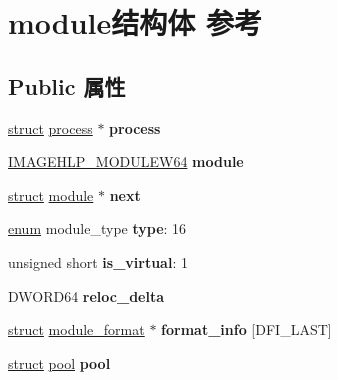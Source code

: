 \hypertarget{structmodule}{}\section{module结构体 参考}
\label{structmodule}
\subsection*{Public 属性}
\begin{DoxyCompactItemize}
\item 
\mbox{\label{structmodule_a5bad3b00337d5bd02b3b0518f61fdba0}} 
\hyperlink{interfacestruct}{struct} \hyperlink{structprocess}{process} $\ast$ {\bfseries process}
\item 
\mbox{\label{structmodule_a49824da1ef1f534c725000a8be10b577}} 
\hyperlink{struct___i_m_a_g_e_h_l_p___m_o_d_u_l_e_w64}{I\+M\+A\+G\+E\+H\+L\+P\+\_\+\+M\+O\+D\+U\+L\+E\+W64} {\bfseries module}
\item 
\mbox{\label{structmodule_aad58ccfbc784d03630d7e8a7fef10079}} 
\hyperlink{interfacestruct}{struct} \hyperlink{structmodule}{module} $\ast$ {\bfseries next}
\item 
\mbox{\label{structmodule_ae2d41929d79e7ffe6853973cc95f45bf}} 
\hyperlink{interfaceenum}{enum} module\+\_\+type {\bfseries type}\+: 16
\item 
\mbox{\label{structmodule_a3cf76532b950f527834a9e0e318f9cd2}} 
unsigned short {\bfseries is\+\_\+virtual}\+: 1
\item 
\mbox{\label{structmodule_a27adb585628fd51639d7c9e93c7cc91d}} 
D\+W\+O\+R\+D64 {\bfseries reloc\+\_\+delta}
\item 
\mbox{\label{structmodule_a7ee5c214cf61fe18d59576bd29b5e8a8}} 
\hyperlink{interfacestruct}{struct} \hyperlink{structmodule__format}{module\+\_\+format} $\ast$ {\bfseries format\+\_\+info} \mbox{[}D\+F\+I\+\_\+\+L\+A\+ST\mbox{]}
\item 
\mbox{\label{structmodule_afacceb07ba4383ff1a0ad68e80745750}} 
\hyperlink{interfacestruct}{struct} \hyperlink{structpool}{pool} {\bfseries pool}

\end{DoxyCompactItemize}
